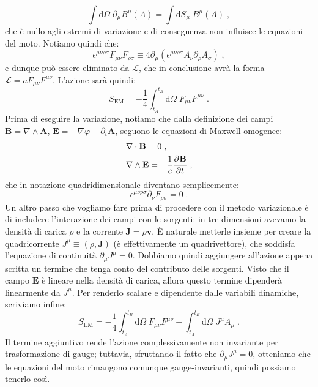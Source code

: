 \documentclass[12pt,a4paper]{report}
\theoremstyle{definition}
\newcommand{\pdev}[3][]{\frac{\partial^{#1} #2}{\partial #3^{#1}}}
\newcommand{\lag}{\mathcal{L}}
\newcommand{\diff}[1][]{\mathrm{d}#1}
\begin{document}
\begin{equation}
\int \diff{\Omega}\; \partial_{\mu}B^{\mu}(A)=\int\diff{S_{\mu}}\; B^{\mu}(A)\;,
\end{equation}
che è nullo agli estremi di variazione e di conseguenza non influisce le equazioni del moto. Notiamo quindi che:
\begin{equation}
\epsilon^{\mu\nu\rho\sigma}F_{\mu\nu}F_{\rho\sigma}\equiv 4\partial_{\mu}(\epsilon^{\mu\nu\rho\sigma}A_{\nu}\partial_{\rho}A_{\sigma})\;,
\end{equation}
e dunque può essere eliminato da $\lag$, che in conclusione avrà la forma $\lag=aF_{\mu\nu}F^{\mu\nu}$. L'azione sarà quindi:
\begin{equation}
S_{\mathrm{EM}}=-\frac{1}{4}\int_{t_A}^{t_B}\diff{\Omega}\;F_{\mu\nu}F^{\mu\nu}\;.
\end{equation}
Prima di eseguire la variazione, notiamo che dalla definizione dei campi $\mathbf{B}=\nabla\wedge \mathbf{A}$, $\mathbf{E}=-\nabla\varphi-\partial_t\mathbf{A}$, seguono le equazioni di Maxwell omogenee:
\begin{align}
&\nabla\cdot\mathbf{B}=0 \notag\;, \\
&\nabla\wedge\mathbf{E}=-\frac{1}{c}\pdev{\mathbf{B}}{t}\;,
\end{align}
che in notazione quadridimensionale diventano semplicemente:
\begin{equation}
\epsilon^{\mu\nu\rho\sigma}\partial_{\nu}F_{\rho\sigma}=0\;.
\end{equation}
Un altro passo che vogliamo fare prima di procedere con il metodo variazionale è di includere l'interazione dei campi con le sorgenti: in tre dimensioni avevamo la densità di carica $\rho$ e la corrente $\mathbf{J}=\rho\mathbf{v}$. È naturale metterle insieme per creare la quadricorrente $J^{\mu}\equiv(\rho,\mathbf{J})$ (è effettivamente un quadrivettore), che soddisfa l'equazione di continuità $\partial_{\mu}J^{\mu}=0$. Dobbiamo quindi aggiungere all'azione appena scritta un termine che tenga conto del contributo delle sorgenti. Visto che il campo $\mathbf{E}$ è lineare nella densità di carica, allora questo termine dipenderà linearmente da $J^{\mu}$. Per renderlo scalare e dipendente dalle variabili dinamiche, scriviamo infine:
\begin{equation}
S_{\mathrm{EM}}=-\frac{1}{4}\int_{t_A}^{t_B}\diff{\Omega}\;F_{\mu\nu}F^{\mu\nu}+\int_{t_A}^{t_B}\diff{\Omega}\;J^{\mu}A_{\mu}\;.
\end{equation}
Il termine aggiuntivo rende l'azione complessivamente non invariante per trasformazione di gauge; tuttavia, sfruttando il fatto che $\partial_{\mu}J^{\mu}=0$, otteniamo che le equazioni del moto rimangono comunque gauge-invarianti, quindi possiamo tenerlo così. \\
\end{document}
